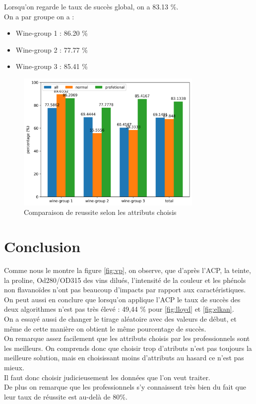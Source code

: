 \documentclass[a4paper,12pt]{article}
\begin{document}
Lorsqu'on regarde le taux de succès global, on a 83.13 \%.\\

On a par groupe on a :
\begin{itemize}
\item Wine-group 1 : 86.20 \%
\item Wine-group 2 : 77.77 \%
\item Wine-group 3 : 85.41 \%
\end{itemize}
\newpage
\begin{figure}[h!] %
   \centering
   \includegraphics[width=0.8\textwidth]{differents_attributes.png} %
   \caption{Comparaison de reussite selon les attributs choisis}
\end{figure}

\section{Conclusion}
\label{sec:conclusion}

Comme nous le montre la figure \ref{fig:vp}, on observe, que d'après l'ACP,  la teinte, la proline, Od280/OD315 des vins dilués, l'intensité de la couleur et les phénols non flavanoïdes n'ont pas beaucoup d'impacts par rapport aux caractéristiques.\\

On peut aussi en conclure que lorsqu'on applique l'ACP le taux de succès des deux algorithmes n'est pas très élevé : 49,44 \% pour \ref{fig:lloyd} et \ref{fig:elkan}.\\

On a essayé aussi de changer le tirage aléatoire avec des valeurs de début, et même de cette manière on obtient le même pourcentage de succès.\\

On remarque assez facilement que les attributs choisis par les professionnels sont les meilleurs. On comprends donc que choisir trop d'atributs n'est pas toujours la meilleure solution, mais en choisissant moins d'attributs au hasard ce n'est pas mieux.\\

Il faut donc choisir judicieusement les données que l'on veut traiter.\\

De plus on remarque que les professionnels s'y connaissent très bien du fait que leur taux de réussite est au-delà de 80\%. 
\end{document}

